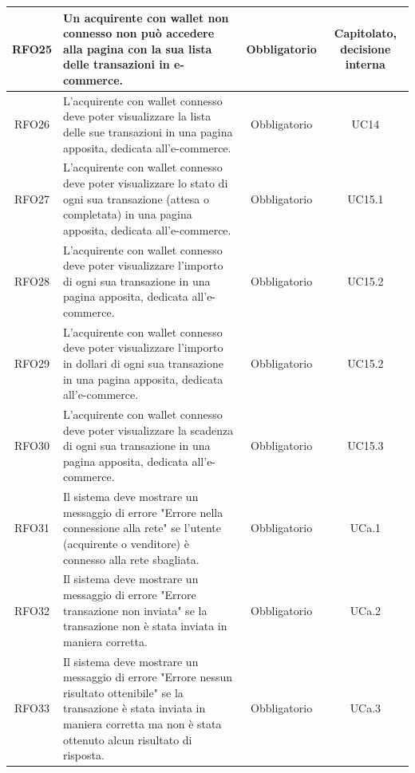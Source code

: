 \documentclass[a4paper, 12pt]{article}
\begin{document}
\begin{longtable}{|c|p{5cm}|c|c|}
\hline
RFO25 & Un acquirente con wallet non connesso non può accedere alla pagina con la sua lista delle transazioni in e-commerce. & Obbligatorio & Capitolato, decisione interna \\
\hline
RFO26 & L'acquirente con wallet connesso deve poter visualizzare la lista delle sue transazioni in una pagina apposita, dedicata all'e-commerce. & Obbligatorio & UC14 \\
\hline
RFO27 & L'acquirente con wallet connesso deve poter visualizzare lo stato di ogni sua transazione (attesa o completata) in una pagina apposita, dedicata all'e-commerce. & Obbligatorio & UC15.1 \\
\hline
RFO28 & L'acquirente con wallet connesso deve poter visualizzare l'importo di ogni sua transazione in una pagina apposita, dedicata all'e-commerce. & Obbligatorio & UC15.2 \\
\hline
RFO29 & L'acquirente con wallet connesso deve poter visualizzare l'importo in dollari di ogni sua transazione in una pagina apposita, dedicata all'e-commerce. & Obbligatorio & UC15.2 \\
\hline
RFO30 & L'acquirente con wallet connesso deve poter visualizzare la scadenza di ogni sua transazione in una pagina apposita, dedicata all'e-commerce. & Obbligatorio & UC15.3 \\
\hline
RFO31 & Il sistema deve mostrare un messaggio di errore "Errore nella connessione alla rete" se l'utente (acquirente o venditore) è connesso alla rete sbagliata. & Obbligatorio & UCa.1 \\
\hline
RFO32 & Il sistema deve mostrare un messaggio di errore "Errore transazione non inviata" se la transazione non è stata inviata in maniera corretta. & Obbligatorio & UCa.2 \\
\hline
RFO33 & Il sistema deve mostrare un messaggio di errore "Errore nessun risultato ottenibile" se la transazione è stata inviata in maniera corretta ma non è stata ottenuto alcun risultato di risposta. & Obbligatorio & UCa.3 \\
\hline

\end{longtable}
\pagebreak
\end{document}

